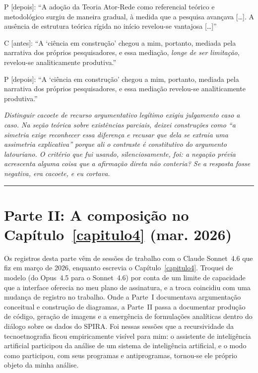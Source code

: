 \begin{faladaP}
P [depois]: ``A adoção da Teoria Ator-Rede como referencial teórico e metodológico surgiu de maneira gradual, à medida que a pesquisa avançava [\ldots]. A ausência de estrutura teórica rígida no início revelou-se vantajosa [\ldots]''
\end{faladaP}

\begin{faladaC}
C [antes]: ``A `ciência em construção' chegou a mim, portanto, mediada pela narrativa dos próprios pesquisadores, e essa mediação, \emph{longe de ser limitação}, revelou-se analiticamente produtiva.''
\end{faladaC}

\begin{faladaP}
P [depois]: ``A `ciência em construção' chegou a mim, portanto, mediada pela narrativa dos próprios pesquisadores, e essa mediação revelou-se analiticamente produtiva.''
\end{faladaP}

\noindent\emph{Distinguir cacoete de recurso argumentativo legítimo exigiu julgamento caso a caso. Na seção teórica sobre existências parciais, deixei construções como ``a simetria exige reconhecer essa diferença e recusar que dela se extraia uma assimetria explicativa'' porque ali o contraste é constitutivo do argumento latouriano. O critério que fui usando, silenciosamente, foi: a negação prévia acrescenta alguma coisa que a afirmação direta não conteria? Se a resposta fosse negativa, era cacoete, e eu cortava.}

\bigskip
\noindent\rule{\textwidth}{0.4pt}


\part*{Parte II: A composição no Capítulo~\ref{capitulo4} (mar. 2026)}

Os registros desta parte vêm de sessões de trabalho com o Claude Sonnet~4.6 que fiz em março de 2026, enquanto escrevia o Capítulo~\ref{capitulo4}. Troquei de modelo (do Opus~4.5 para o Sonnet~4.6) por conta de um limite de capacidade que a interface oferecia no meu plano de assinatura, e a troca coincidiu com uma mudança de registro no trabalho. Onde a Parte~I documentava argumentação conceitual e construção de diagramas, a Parte~II passa a documentar produção de código, geração de imagens e a emergência de formulações analíticas dentro do diálogo sobre os dados do SPIRA. Foi nessas sessões que a recursividade da tecnoetnografia ficou empiricamente visível para mim: o assistente de inteligência artificial participou da análise de um sistema de inteligência artificial, e o modo como participou, com seus programas e antiprogramas, tornou-se ele próprio objeto da minha análise.

